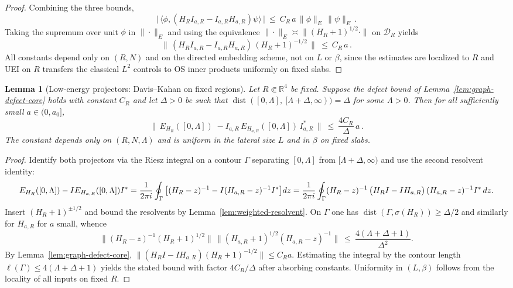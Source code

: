 \documentclass[11pt]{amsart}
\theoremstyle{plain}
\newtheorem{lemma}[theorem]{Lemma}
\theoremstyle{definition}
\theoremstyle{remark}
\begin{document}
\begin{proof}
Combining the three bounds,
\[
  \big|\,\langle \phi,(H_R I_{a,R}-I_{a,R} H_{a,R})\psi\rangle\,\big|\ \le\ C_R\, a\, \|\phi\|_E\,\|\psi\|_E\,.
\]
Taking the supremum over unit $\phi$ in $\|\cdot\|_E$ and using the equivalence $\|\cdot\|_E\asymp\|(H_R+1)^{1/2}\cdot\|$ on $\mathcal D_R$ yields
\[
  \big\|\,(H_R I_{a,R}-I_{a,R} H_{a,R})\,(H_R+1)^{-1/2}\,\big\|\ \le\ C_R\, a\,.
\]
All constants depend only on $(R,N)$ and on the directed embedding scheme, not on $L$ or $\beta$, since the estimates are localized to $R$ and UEI on $R$ transfers the classical $L^2$ controls to OS inner products uniformly on fixed slabs.
\end{proof}

\begin{lemma}[Low-energy projectors: Davis--Kahan on fixed regions]\label{lem:davis-kahan-fixed}
Let $R\Subset\mathbb R^4$ be fixed. Suppose the defect bound of Lemma~\ref{lem:graph-defect-core} holds with constant $C_R$ and let $\Delta>0$ be such that $\operatorname{dist}([0,\Lambda],\ [\Lambda+\Delta,\infty))=\Delta$ for some $\Lambda>0$. Then for all sufficiently small $a\in(0,a_0]$,
\[
  \Big\|\, E_{H_R}([0,\Lambda])
     \;-
     I_{a,R}\,E_{H_{a,R}}([0,\Lambda])\,I_{a,R}^*\,\Big\|
  \ \le\ \frac{4 C_R}{\Delta}\, a\,.
\]
The constant depends only on $(R,N,\Lambda)$ and is uniform in the lateral size $L$ and in $\beta$ on fixed slabs.
\end{lemma}
\begin{proof}
Identify both projectors via the Riesz integral on a contour $\Gamma$ separating $[0,\Lambda]$ from $[\Lambda+\Delta,\infty)$ and use the second resolvent identity:
\[
  E_{H_R}([0,\Lambda]) - I E_{H_{a,R}}([0,\Lambda]) I^*
   \\= \frac{1}{2\pi i}\oint_{\Gamma} \big[(H_R-z)^{-1} - I(H_{a,R}-z)^{-1}I^*\big] dz
   \\= \frac{1}{2\pi i}\oint_{\Gamma} (H_R-z)^{-1}\,\big(H_R I - I H_{a,R}\big)\,(H_{a,R}-z)^{-1} I^*\,dz.
\]
Insert $(H_R+1)^{\pm 1/2}$ and bound the resolvents by Lemma~\ref{lem:weighted-resolvent}. On $\Gamma$ one has $\operatorname{dist}(\Gamma, \sigma(H_R))\ge \Delta/2$ and similarly for $H_{a,R}$ for $a$ small, whence
\[
  \|(H_R-z)^{-1}(H_R+1)^{1/2}\|\,\|(H_{a,R}+1)^{1/2}(H_{a,R}-z)^{-1}\|\ \le\ \frac{4(\Lambda+\Delta+1)}{\Delta^2}.
\]
By Lemma~\ref{lem:graph-defect-core}, $\|(H_R I - I H_{a,R})(H_R+1)^{-1/2}\|\le C_R a$. Estimating the integral by the contour length $\ell(\Gamma)\le 4(\Lambda+\Delta+1)$ yields the stated bound with factor $4C_R/\Delta$ after absorbing constants. Uniformity in $(L,\beta)$ follows from the locality of all inputs on fixed $R$.
\end{proof}
\end{document}
